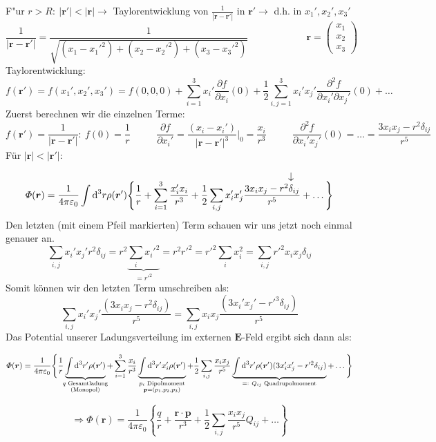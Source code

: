 \documentclass[titlepage,11pt,a4paper,ngerman]{report}
\newcommand*{\eqdef}{=\mathrel{\vcenter{\baselineskip0.5ex \lineskiplimit0pt \hbox{\scriptsize.}\hbox{\scriptsize.}}}}
\newcommand{\tx}[1]{\textrm{#1}}
\newcommand{\dd}{\tx{d}}
\newcommand{\custoup}[3]{\overset{\scriptstyle\underset{\mkern4mu\rotatebox{-90}{$\hspace{-3pt} #1$}}{#3}}{#2}}
\renewcommand{\Phi}{\varPhi}
\renewcommand{\vec}[1]{\boldsymbol{#1}}
\renewcommand{\epsilon}{\varepsilon}
\begin{document}
F"ur $r>R:\ |\vec{r}'|<|\vec{r}|\rightarrow$ Taylorentwicklung von $\frac{1}{|\vec{r}-\vec{r}'|}$ in $\vec{r'} \rightarrow$ d.h. in $ x_1',x_2',x_3'$ \\
\[\frac{1}{|\vec{r}-\vec{r}'|}=\frac{1}{\sqrt{(x_1-x_1'^2)+(x_2-x_2'^2)+(x_3-x_3'^2)}} \qquad \qquad \qquad \vec{r}=\begin{pmatrix}x_1\\x_2\\x_3\end{pmatrix}\]
Taylorentwicklung:
\[f(\vec{r}')=f(x_1',x_2',x_3')=f(0,0,0)+\sum_{i=1}^3x_i'\frac{\partial f}{\partial x_i}(0)+\frac{1}{2}\sum_{i,j=1}^3x_i'x_j'\frac{\partial^2f}{\partial x_i'\partial x_j'}(0)+\ldots\]
Zuerst berechnen wir die einzelnen Terme:
\[f(\vec{r}')=\frac{1}{|\vec{r}-\vec{r}'|}:\ f(0)=\frac{1}{r} \qquad \ \ \  \frac{\partial f}{\partial x_i'}=\frac{(x_i-x_i')}{|\vec{r}-\vec{r}'|^3}\bigg|_0=\frac{x_i}{r^3} \qquad \ \ \ \frac{\partial^2f}{\partial x_i'x_j'}(0)=\ldots=\frac{3x_ix_j-r^2 \delta_{ij}}{r^5}\]
Für $|\vec{r}|<|\vec{r}'|$:
\vspace{-15pt} \[\Phi(\vec{r})=\frac{1}{4\pi\epsilon_0}\int\dd^3r\rho(\vec{r}')\Bigg\{\frac{1}{r}+\sum_{i=1}^3\frac{x_i'x_i}{r^3}+\frac{1}{2}\sum_{i,j}x_i'x_j'\frac{3x_ix_j-\custoup{\rightarrow}{r^2\delta_{ij}}{}}{r^5}+\ldots\Bigg\}\]
Den letzten (mit einem Pfeil markierten) Term schauen wir uns jetzt noch einmal genauer an.
\[\sum_{i,j}x_i'x_j'r^2\delta_{ij}=r^2\underbrace{\sum_ix_i'^2}_{=r'^2}=r^2r'^2=r'^2\sum_ix_i^2=\sum_{i,j}r'^2x_ix_j\delta_{ij}\]
Somit können wir den letzten Term umschreiben als:
\[\sum_{i,j}x_i'x_j'\frac{(3x_ix_j-r^2\delta_{ij})}{r^5}=\sum_{i,j}x_ix_j\frac{(3x_i'x_j'-r'^3\delta_{ij})}{r^5}\]
Das Potential unserer Ladungsverteilung im externen $ \vec{E} $-Feld ergibt sich dann als:
\begin{small}
	\[\Phi(\vec{r})=\frac{1}{4\pi\epsilon_0}\Bigg\{\frac{1}{r} \underbrace{\int\dd^3r'\rho(\vec{r}')}_{\mathclap{\substack{ q \textrm{ Gesamtladung} \\  \tx{(Monopol)}}}} +\sum_{i=1}^3\frac{x_i}{r^3} \underbrace{\int\dd^3r'x_i'\rho(\vec{r}')}_{\mathclap{\substack{p_i \textrm{ Dipolmoment} \\ \vec{p}=(p_1,p_2,p_3)}}}  +\frac{1}{2}\sum_{i,j}\frac{x_ix_j}{r^5}\underbrace{\int\dd^3r'\rho(\vec{r}')(3x_i'x_j'-r'^2\delta_{ij})}_{\mathclap{\eqdef\ Q_{ij}\textrm{ Quadrupolmoment}}}+\ldots\Bigg\}\]
\end{small}
\[\Rightarrow\Phi(\vec{r})=\frac{1}{4\pi\epsilon_0}\left\{\frac{q}{r}+\frac{\vec{r}\cdot\vec{p}}{r^3}+\frac{1}{2}\sum_{i,j}\frac{x_ix_j}{r^5}Q_{ij}+\ldots\right\}\]
\end{document}
